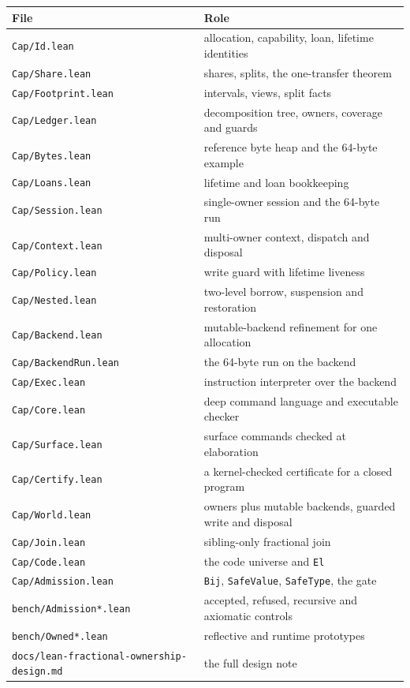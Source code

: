 \documentclass[10pt,a4paper]{article}
\newcommand{\file}[1]{\texttt{\small #1}}
\begin{document}
\begin{center}
\begin{tabular}{@{}ll@{}}
\toprule
File & Role \\
\midrule
\file{Cap/Id.lean} & allocation, capability, loan, lifetime identities \\
\file{Cap/Share.lean} & shares, splits, the one-transfer theorem \\
\file{Cap/Footprint.lean} & intervals, views, split facts \\
\file{Cap/Ledger.lean} & decomposition tree, owners, coverage and guards \\
\file{Cap/Bytes.lean} & reference byte heap and the 64-byte example \\
\file{Cap/Loans.lean} & lifetime and loan bookkeeping \\
\file{Cap/Session.lean} & single-owner session and the 64-byte run \\
\file{Cap/Context.lean} & multi-owner context, dispatch and disposal \\
\file{Cap/Policy.lean} & write guard with lifetime liveness \\
\file{Cap/Nested.lean} & two-level borrow, suspension and restoration \\
\file{Cap/Backend.lean} & mutable-backend refinement for one allocation \\
\file{Cap/BackendRun.lean} & the 64-byte run on the backend \\
\file{Cap/Exec.lean} & instruction interpreter over the backend \\
\file{Cap/Core.lean} & deep command language and executable checker \\
\file{Cap/Surface.lean} & surface commands checked at elaboration \\
\file{Cap/Certify.lean} & a kernel-checked certificate for a closed program \\
\file{Cap/World.lean} & owners plus mutable backends, guarded write and disposal \\
\file{Cap/Join.lean} & sibling-only fractional join \\
\file{Cap/Code.lean} & the code universe and \texttt{El} \\
\file{Cap/Admission.lean} & \texttt{Bij}, \texttt{SafeValue}, \texttt{SafeType}, the gate \\
\file{bench/Admission*.lean} & accepted, refused, recursive and axiomatic controls \\
\file{bench/Owned*.lean} & reflective and runtime prototypes \\
\file{docs/lean-fractional-ownership-design.md} & the full design note \\
\bottomrule
\end{tabular}
\end{center}
\end{document}

